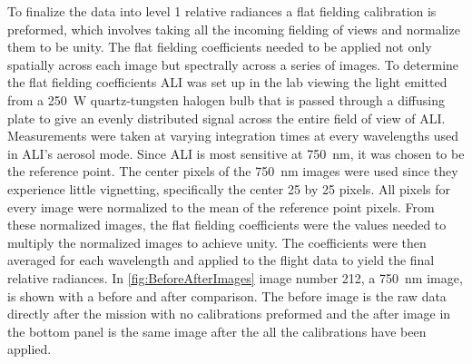 To finalize the data into level 1 relative radiances a flat fielding calibration is preformed, which involves taking all the incoming fielding of views and normalize them to be unity. The flat fielding coefficients needed to be applied not only spatially across each image but spectrally across a series of images. To determine the flat fielding coefficients ALI was set up in the lab viewing the light emitted from a 250~W quartz-tungsten halogen bulb that is passed through a diffusing plate to give an evenly distributed signal across the entire field of view of ALI. Measurements were taken at varying integration times at every wavelengths used in ALI's aerosol mode. Since ALI is most sensitive at 750~nm, it was chosen to be the reference point. The center pixels of the 750~nm images were used since they experience little vignetting, specifically the center 25 by 25 pixels. All pixels for every image were normalized to the mean of the reference point pixels. From these normalized images, the flat fielding coefficients were the values needed to multiply the normalized images to achieve unity. The coefficients were then averaged for each wavelength and applied to the flight data to yield the final relative radiances. In \autoref{fig:BeforeAfterImages} image number 212, a 750~nm image, is shown with a before and after comparison. The before image is the raw data directly after the mission with no calibrations preformed and the after image in the bottom panel is the same image after the all the calibrations have been applied.



